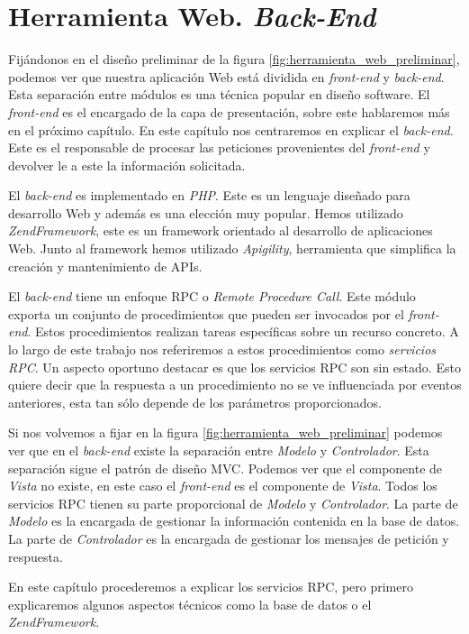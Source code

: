 \chapter{Herramienta Web. \emph{Back-End}}
\label{backend}

Fijándonos en el diseño preliminar de la figura \ref{fig:herramienta_web_preliminar}, podemos ver que nuestra aplicación Web está dividida en
\emph{front-end} y \emph{back-end}. Esta separación entre módulos es una técnica popular en diseño software. El \emph{front-end} es el encargado de la
capa de presentación, sobre este hablaremos más en el próximo capítulo. En este capítulo nos centraremos en explicar el \emph{back-end}. Este es el
responsable de procesar las peticiones provenientes del \emph{front-end} y devolver le a este la información solicitada. 
\par
El \emph{back-end} es implementado en \emph{PHP}\cite{PHP}. Este es un lenguaje diseñado para desarrollo Web y además es una elección muy popular. Hemos
utilizado \emph{ZendFramework}\cite{ZF}, este es un framework orientado al desarrollo de aplicaciones Web. Junto al framework hemos utilizado
\emph{Apigility}\cite{Apigility}, herramienta que simplifica la creación y mantenimiento de APIs.
\par
El \emph{back-end} tiene un enfoque RPC o \emph{Remote Procedure Call}. Este módulo exporta un conjunto de procedimientos que pueden ser invocados por
el \emph{front-end}. Estos procedimientos realizan tareas específicas sobre un recurso concreto. A lo largo de este trabajo nos referiremos a estos
procedimientos como \emph{servicios RPC}. Un aspecto oportuno destacar es que los servicios RPC son sin estado. Esto quiere decir que la respuesta a
un procedimiento no se ve influenciada por eventos anteriores, esta tan sólo depende de los parámetros proporcionados.
\par
Si nos volvemos a fijar en la figura \ref{fig:herramienta_web_preliminar} podemos ver que en el \emph{back-end} existe la separación entre
\emph{Modelo} y \emph{Controlador}. Esta separación sigue el patrón de diseño MVC\cite{MVCWiki}. Podemos ver que el componente de \emph{Vista} no
existe, en este caso el \emph{front-end} es el componente de \emph{Vista}. Todos los servicios RPC tienen su parte proporcional de \emph{Modelo} y
\emph{Controlador}. La parte de \emph{Modelo} es la encargada de gestionar la información contenida en la base de datos. La parte de
\emph{Controlador} es la encargada de gestionar los mensajes de petición y respuesta.
\par
En este capítulo procederemos a explicar los servicios RPC, pero primero explicaremos algunos aspectos técnicos como la base de datos o el
\emph{ZendFramework}.
